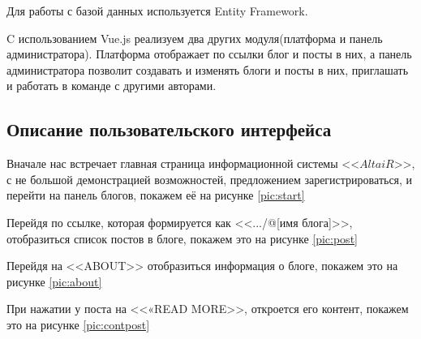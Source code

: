 Для работы с базой данных используется Entity Framework.

C использованием Vue.js реализуем два других модуля(платформа и панель администратора). Платформа отображает по ссылки блог и посты в них, а панель администратора позволит создавать и изменять блоги и посты в них, приглашать и работать в команде с другими авторами. 

\pagebreak
\subsection{Описание пользовательского интерфейса}

Вначале нас встречает главная страница информационной системы <<$AltaiR$>>, с не большой демонстрацией возможностей, предложением зарегистрироваться, и перейти на панель блогов, покажем её на рисунке \ref{pic:start}


Перейдя по ссылке, которая формируется как <<.../@[имя блога]>>, отобразиться список постов в блоге, покажем это на рисунке \ref{pic:post}


\pagebreak
Перейдя на <<ABOUT>> отобразиться информация о блоге, покажем это на рисунке \ref{pic:about}


При нажатии у поста на <<«READ MORE>>, откроется его контент, покажем это на рисунке \ref{pic:contpost}

\pagebreak